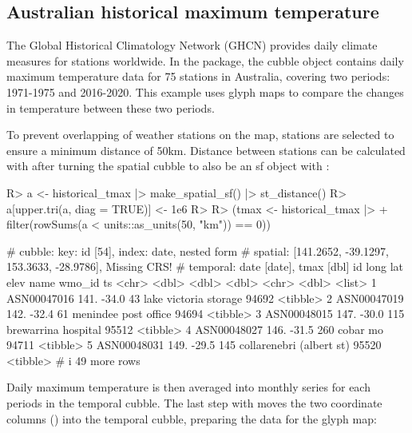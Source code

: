 \documentclass[
  shortnames]{jss}
\begin{document}
\hypertarget{historicaltmax}{%
\subsection{Australian historical maximum temperature}\label{historicaltmax}}

The Global Historical Climatology Network (GHCN) provides daily climate measures for stations worldwide. In the  package, the cubble object  contains daily maximum temperature data for 75 stations in Australia, covering two periods: 1971-1975 and 2016-2020. This example uses glyph maps to compare the changes in temperature between these two periods.

To prevent overlapping of weather stations on the map, stations are selected to ensure a minimum distance of 50km. Distance between stations can be calculated with  after turning the spatial cubble to also be an sf object with :

\begin{CodeChunk}
\begin{CodeInput}
R> a <- historical_tmax |> make_spatial_sf() |> st_distance()
R> a[upper.tri(a, diag = TRUE)] <- 1e6
R> 
R> (tmax <- historical_tmax |> 
+   filter(rowSums(a < units::as_units(50, "km")) == 0))
\end{CodeInput}
\begin{CodeOutput}
# cubble:   key: id [54], index: date, nested form
# spatial:  [141.2652, -39.1297, 153.3633, -28.9786], Missing CRS!
# temporal: date [date], tmax [dbl]
  id           long   lat  elev name                     wmo_id ts      
  <chr>       <dbl> <dbl> <dbl> <chr>                     <dbl> <list>  
1 ASN00047016  141. -34.0    43 lake victoria storage     94692 <tibble>
2 ASN00047019  142. -32.4    61 menindee post office      94694 <tibble>
3 ASN00048015  147. -30.0   115 brewarrina hospital       95512 <tibble>
4 ASN00048027  146. -31.5   260 cobar mo                  94711 <tibble>
5 ASN00048031  149. -29.5   145 collarenebri (albert st)  95520 <tibble>
# i 49 more rows
\end{CodeOutput}
\end{CodeChunk}

Daily maximum temperature is then averaged into monthly series for each periods in the temporal cubble. The last step with  moves the two coordinate columns () into the temporal cubble, preparing the data for the glyph map:
\end{document}
